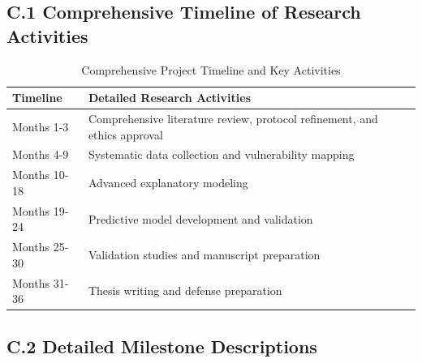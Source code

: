 \graphicspath{{./}{./sections/images/}{./images/}}\documentclass[12pt,a4paper,landscape]{article}
\begin{document}
\subsection*{C.1 Comprehensive Timeline of Research Activities}
\begin{table}[H]
    \centering
    \caption{Comprehensive Project Timeline and Key Activities}
    \label{tab:timeline}
    \begin{tabular}{L{3cm}L{12cm}}
        \toprule
        \textbf{Timeline} & \textbf{Detailed Research Activities} \\
        \midrule
        Months 1-3 & Comprehensive literature review, protocol refinement, and ethics approval \\
        \addlinespace
        Months 4-9 & Systematic data collection and vulnerability mapping \\
        \addlinespace
        Months 10-18 & Advanced explanatory modeling \\
        \addlinespace
        Months 19-24 & Predictive model development and validation \\
        \addlinespace
        Months 25-30 & Validation studies and manuscript preparation \\
        \addlinespace
        Months 31-36 & Thesis writing and defense preparation \\
        \bottomrule
    \end{tabular}
\end{table}

\subsection*{C.2 Detailed Milestone Descriptions}
\end{document}
